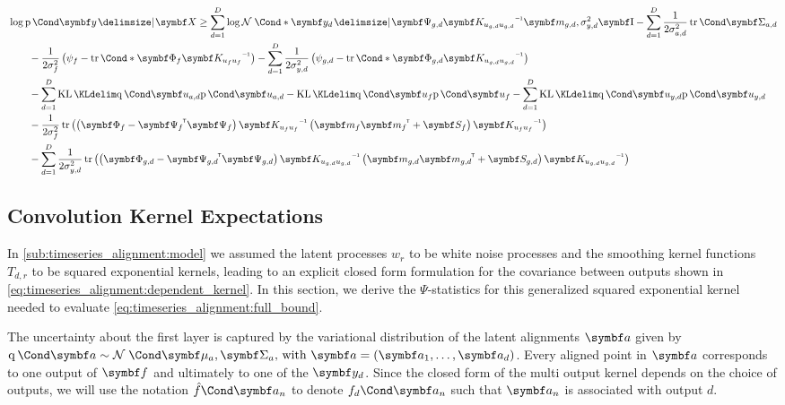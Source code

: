 \begin{align}
\label{eq:timeseries_alignment:full_bound}
\begin{split}
    \MoveEqLeft\log \Prob{\rv{y}\given \mat{X}} \geq
    \sum_{d=1}^D \log\Gaussian*{\rv{y_d} \given \mat{\Psi_{g, d}} \mat{K_{u_{g, d}u_{g, d}}}\inv \mat{m_{g, d}}, \sigma_{y, d}^2 \Eye}
    - \sum_{d=1}^D \frac{1}{2\sigma_{a, d}^2} \Fun{\tr}{\mat{\Sigma_{a, d}}} \\
    &- \frac{1}{2\sigma_f^2} \left( \psi_{f} - \Fun*{\tr}{\mat{\Phi_f} \mat{K_{u_fu_f}}\inv} \right)
    - \sum_{d=1}^D\frac{1}{2\sigma_{y, d}^2} \left( \psi_{g, d} - \Fun*\tr{\mat{\Phi_{g, d}} \mat{K_{u_{g, d}u_{g, d}}}\inv} \right) \\
    &- \sum_{d=1}^D \KL{\Variat{\rv{u_{a, d}}}}{\Prob{\rv{u_{a, d}}}}
    - \KL{\Variat{\rv{u_f}}}{\Prob{\rv{u_f}}}
    - \sum_{d=1}^D \KL{\Variat{\rv{u_{y, d}}}}{\Prob{\rv{u_{y, d}}}} \\
    &- \frac{1}{2\sigma_f^2} \tr\left(\left(\mat{\Phi_f} - \mat{\Psi_f}\tran\mat{\Psi_f}\right) \mat{K_{u_fu_f}}\inv \left(\mat{m_f}\mat{m_f}\tran + \mat{S_f}\right)\mat{K_{u_fu_f}}\inv\right) \\
    &- \sum_{d=1}^D\frac{1}{2\sigma_{y, d}^2} \tr\left(\left(\mat{\Phi_{g, d}} - \mat{\Psi_{g, d}}\tran\mat{\Psi_{g, d}}\right)
    \mat{K_{u_{g, d}u_{g, d}}}\inv \left(\mat{m_{g, d}}\mat{m_{g, d}}\tran + \mat{S_{g, d}}\right) \mat{K_{u_{g, d}u_{g, d}}}\inv\right)
\end{split}
\end{align}

\subsection{Convolution Kernel Expectations}
\label{sub:timeseries_alignment:kernel_expectations}
In \cref{sub:timeseries_alignment:model} we assumed the latent processes $w_r$ to be white noise processes and the smoothing kernel functions $T_{d, r}$ to be squared exponential kernels, leading to an explicit closed form formulation for the covariance between outputs shown in \cref{eq:timeseries_alignment:dependent_kernel}.
In this section, we derive the $\Psi$-statistics for this generalized squared exponential kernel needed to evaluate \cref{eq:timeseries_alignment:full_bound}.

The uncertainty about the first layer is captured by the variational distribution of the latent alignments $\rv{a}$ given by $\Variat{\rv{a}} \sim \Gaussian{\mat{\mu_a}, \mat{\Sigma_a}}\text{, with } \rv{a} = \left( \rv{a_1}, \dots, \rv{a_d} \right)$.
Every aligned point in $\rv{a}$ corresponds to one output of $\rv{f}$ and ultimately to one of the $\rv{y_d}$.
Since the closed form of the multi output kernel depends on the choice of outputs, we will use the notation $\Fun{\hat{f}}{\rv{a_n}}$ to denote $\Fun{f_d}{\rv{a_n}}$ such that $\rv{a_n}$ is associated with output $d$.

